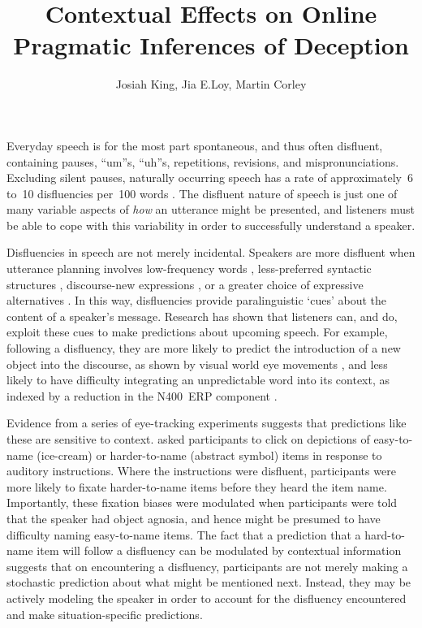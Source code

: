 \documentclass[a4paper,man,natbib]{apa6}
\title{Contextual Effects on Online Pragmatic Inferences of Deception}
\author{Josiah King, Jia E.\@ Loy, Martin Corley}
\affiliation{Psychology, PPLS, University of Edinburgh}
\newcommand*{\spex}[1]{``{#1}''} %
\begin{document}
\maketitle


\noindent
Everyday speech is for the most part spontaneous, and thus often disfluent, containing pauses, \spex{um}s, \spex{uh}s, repetitions, revisions, and mispronunciations.
Excluding silent pauses, naturally occurring speech has a rate of approximately~6 to~10 disfluencies per~100 words \citep{Bortfeld2001,FoxTree1995}.
The disfluent nature of speech is just one of many variable aspects of \emph{how} an utterance might be presented, and listeners must be able to cope with this variability in order to successfully understand a speaker.

Disfluencies in speech are not merely incidental.  
Speakers are more disfluent when utterance planning involves low-frequency words \citep{Beattie1979}, less-preferred syntactic structures \citep{Cook2009}, discourse-new expressions \citep{arnold2000heaviness}, or a greater choice of expressive alternatives \citep{Schachter1991}.
In this way, disfluencies provide paralinguistic `cues' about the content of a speaker's message.
Research has shown that listeners can, and do, exploit these cues to make predictions about upcoming speech.
For example, following a disfluency, they are more likely to predict the introduction of a new object into the discourse, as shown by visual world eye movements \citep{Arnold2004}, and less likely to have difficulty integrating an unpredictable word into its context, as indexed by a reduction in the N400~ERP component \citep{Corley2007}.

Evidence from a series of eye-tracking experiments suggests that predictions like these are sensitive to context.
\citet{Arnold2007} asked participants to click on depictions of easy-to-name (ice-cream) or harder-to-name (abstract symbol) items in response to auditory instructions.
Where the instructions were disfluent, participants were more likely to fixate harder-to-name items before they heard the item name.
Importantly, these fixation biases were modulated when participants were told that the speaker had object agnosia, and hence might be presumed to have difficulty naming easy-to-name items.
The fact that a prediction that a hard-to-name item will follow a disfluency can be modulated by contextual information suggests that on encountering a disfluency, participants are not merely making a stochastic prediction about what might be mentioned next.
Instead, they may be actively modeling the speaker in order to account for the disfluency encountered and make situation-specific predictions.
\end{document}
